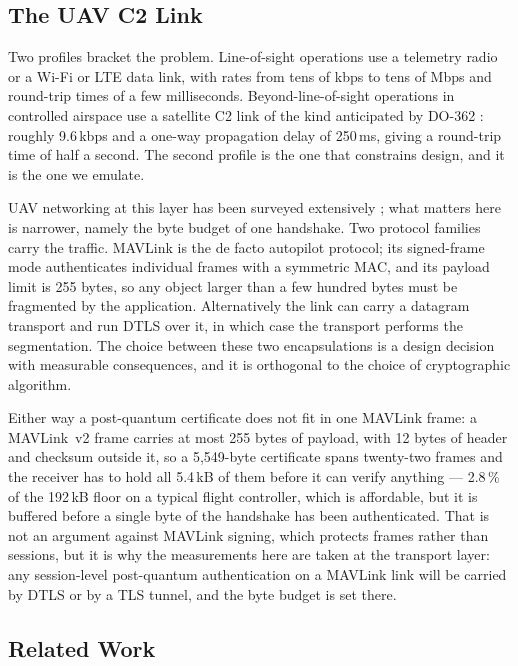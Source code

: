 \documentclass[drones,article,submit,pdftex,moreauthors]{Definitions/mdpi}
\newcommand{\kbps}{kbps}
\newcommand{\Mbps}{Mbps}
\newcommand{\mav}{MAVLink}
\newcommand{\tls}{TLS}
\begin{document}
\subsection{The UAV C2 Link}

Two profiles bracket the problem. Line-of-sight operations use a
telemetry radio or a Wi-Fi or LTE data link, with rates from tens of
\kbps{} to tens of \Mbps{} and round-trip times of a few milliseconds.
Beyond-line-of-sight operations in controlled airspace use a satellite
C2 link of the kind anticipated by DO-362 \cite{do362}: roughly
9.6\,\kbps{} and a one-way propagation delay of 250\,ms, giving a
round-trip time of half a second. The second profile is the one that
constrains design, and it is the one we emulate.

UAV networking at this layer has been surveyed extensively
\cite{zeng2016,mozaffari2019,gupta2016}; what matters here is narrower,
namely the byte budget of one handshake. Two protocol families carry the
traffic. \mav{} \cite{mavlink} is the de facto autopilot protocol; its signed-frame mode authenticates individual
frames with a symmetric MAC, and its payload limit is 255 bytes, so any
object larger than a few hundred bytes must be fragmented by the
application. Alternatively the link can carry a datagram transport and
run DTLS \cite{rfc9147,rfc6347} over it, in which case the transport
performs the segmentation. The choice between these two encapsulations is a design
decision with measurable consequences, and it is orthogonal to the
choice of cryptographic algorithm.

Either way a post-quantum certificate does not fit in one \mav{} frame:
a \mav{}~v2 frame carries at most 255 bytes of payload, with 12 bytes of
header and checksum outside it, so a 5{,}549-byte certificate spans
twenty-two frames and the receiver has to hold all 5.4\,kB of them
before it can verify anything --- 2.8\,\% of the 192\,kB floor on a
typical flight controller, which is affordable, but it is buffered
before a single byte of the handshake has been authenticated. That is not an argument
against \mav{} signing, which protects frames rather than sessions, but
it is why the measurements here are taken at the transport layer: any
session-level post-quantum authentication on a \mav{} link will be
carried by DTLS or by a \tls{} tunnel, and the byte budget is set there.

\subsection{Related Work}
\end{document}
